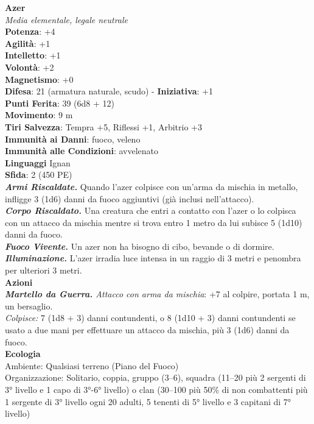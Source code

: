 \begin{multicols}{2}
\medskip\textbf{Azer}\\
\emph{Media elementale, legale neutrale}\\
\textbf{Potenza}: +4\\
\textbf{Agilità}: +1\\
\textbf{Intelletto}: +1\\
\textbf{Volontà}: +2\\
\textbf{Magnetismo}: +0\\
\textbf{Difesa}: 21 (armatura naturale, scudo) - \textbf{Iniziativa}: +1\\
\textbf{Punti Ferita}: 39 (6d8 + 12)\\
\textbf{Movimento}: 9 m\\
\textbf{Tiri Salvezza}: Tempra +5, Riflessi +1, Arbitrio +3\\
\textbf{Immunità ai Danni}: fuoco, veleno\\
\textbf{Immunità alle Condizioni}: avvelenato\\
\textbf{Linguaggi} Ignan\\
\textbf{Sfida}: 2 (450 PE)\smallskip\\
\emph{\textbf{Armi Riscaldate.}} Quando l'azer colpisce con un'arma da mischia in metallo, infligge 3 (1d6) danni da fuoco aggiuntivi (già inclusi nell'attacco).\\
\emph{\textbf{Corpo Riscaldato.}} Una creatura che entri a contatto con l'azer o lo colpisca con un attacco da mischia mentre si trova entro 1 metro da lui subisce 5 (1d10) danni da fuoco.\\
\emph{\textbf{Fuoco Vivente.}} Un azer non ha bisogno di cibo, bevande o di dormire.\\
\emph{\textbf{Illuminazione.}} L'azer irradia luce intensa in un raggio di 3 metri e penombra per ulteriori 3 metri.\\
\smallskip\textbf{Azioni}\\
\emph{\textbf{Martello da Guerra.} Attacco con arma da mischia}: +7 al colpire, portata 1 m, un bersaglio.\\
\emph{Colpisce:} 7 (1d8 + 3) danni contundenti, o 8 (1d10 + 3) danni contundenti se usato a due mani per effettuare un attacco da mischia, più 3 (1d6) danni da fuoco.\\
\textbf{Ecologia}\\
Ambiente: Qualsiasi terreno (Piano del Fuoco)\\
Organizzazione: Solitario, coppia, gruppo (3–6), squadra (11–20 più 2 sergenti di 3° livello e 1 capo di 3°-6° livello) o clan (30–100 più 50\% di non combattenti più 1 sergente di 3° livello ogni 20 adulti, 5 tenenti di 5° livello e 3 capitani di 7° livello)\\

\end{multicols}
